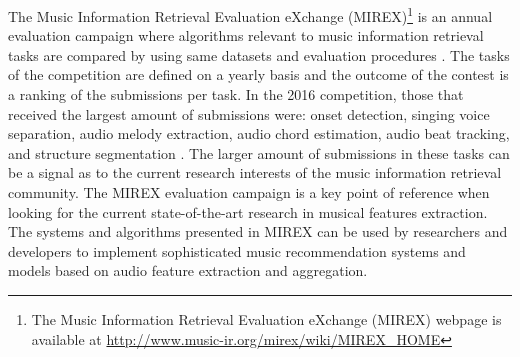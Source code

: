 The Music Information Retrieval Evaluation eXchange (MIREX)\footnote{The Music Information Retrieval Evaluation eXchange (MIREX) webpage is available at \url{http://www.music-ir.org/mirex/wiki/MIREX_HOME}} is an annual evaluation campaign where algorithms relevant to music information retrieval tasks are compared by using same datasets and evaluation procedures \autocite{downie08music}. 
The tasks of the competition are defined on a yearly basis and the outcome of the contest is a ranking of the submissions per task. In the 2016 competition, those that received the largest amount of submissions were: onset detection, singing voice separation, audio melody extraction, audio chord estimation, audio beat tracking, and structure segmentation \autocite{downie16mirex}. The larger amount of submissions in these tasks can be a signal as to the current research interests of the music information retrieval community. 
The MIREX evaluation campaign is a key point of reference when looking for the current state-of-the-art research in musical features extraction. 
The systems and algorithms presented in MIREX can be used by researchers and developers to implement sophisticated music recommendation systems and models based on audio feature extraction and aggregation.

